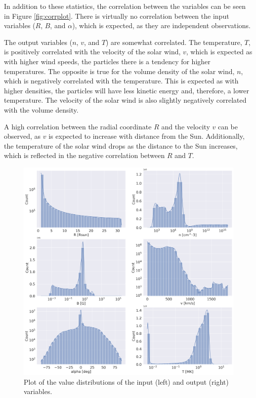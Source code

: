 In addition to these statistics, the correlation between the variables can be seen in Figure \ref{fig:corrplot}. There is virtually no correlation between the input variables ($R$, $B$, and $\alpha$), which is expected, as they are independent observations. 

The output variables ($n$, $v$, and $T$) are somewhat correlated. The temperature, $T$, is positively correlated with the velocity of the solar wind, $v$, which is expected as with higher wind speeds, the particles there is a tendency for higher temperatures. The opposite is true for the volume density of the solar wind, $n$, which is negatively correlated with the temperature. This is expected as with higher densities, the particles will have less kinetic energy and, therefore, a lower temperature. The velocity of the solar wind is also slightly negatively correlated with the volume density.

A high correlation between the radial coordinate $R$ and the velocity $v$ can be observed, as $v$ is expected to increase with distance from the Sun. Additionally, the temperature of the solar wind drops as the distance to the Sun increases, which is reflected in the negative correlation between $R$ and $T$.


\begin{figure}
    \centering
    \includegraphics[width=\textwidth]{figures/joint_var_distribution.png}
    \caption[Value distribution of the dataset variables]{Plot of the value distributions of the input (left) and output (right) variables.}
    \label{fig:joint_vars_distr}
\end{figure}

